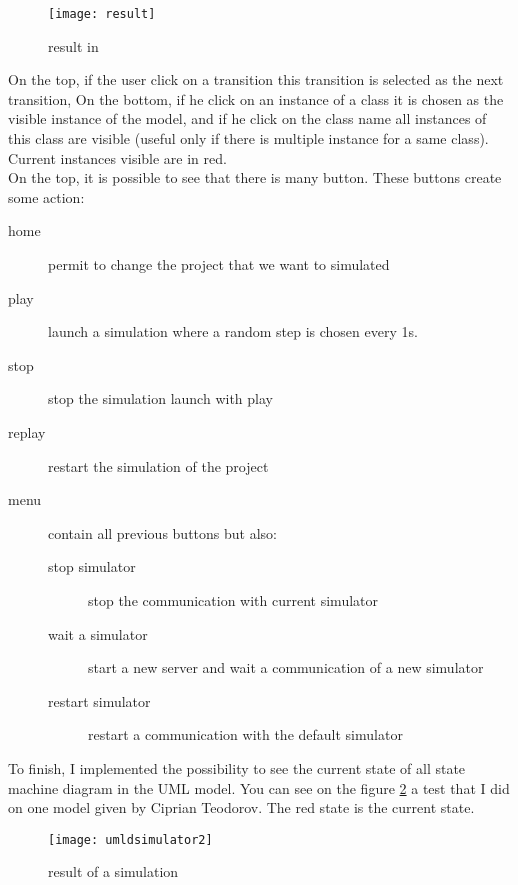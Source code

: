 \begin{figure}[h]
  \centering
  \texttt{[image: result]}
  \caption{result in \umld}
  \label{fig:result}
\end{figure}

On the top, if the user click on a transition this transition is selected as the next transition, On the bottom, if he click on an instance of a class it is chosen as the visible instance of the model, and if he click on the class name all instances of this class are visible (useful only if there is multiple instance for a same class). Current instances visible are in red.
~\\

On the top, it is possible to see that there is many button. These buttons create some action:

\noitemsep
\begin{description}
\item[home] permit to change the project that we want to simulated
\item[play] launch a simulation where a random step is chosen every 1s.
\item[stop] stop the simulation launch with play
\item[replay] restart the simulation of the project
\item[menu] contain all previous buttons but also:
  \begin{description}
  \item[stop simulator] stop the communication with current simulator
  \item[wait a simulator] start a new server and wait a communication of a new simulator
  \item[restart simulator] restart a communication with the default simulator
  \end{description}
\end{description}
\doitemsep


To finish, I implemented the possibility to see the current state of all state machine diagram in the UML model. You can see on the figure \ref{fig:result2} a test that I did on one model given by Ciprian Teodorov. The red state is the current state.

\begin{figure}[h]
  \centering
  \texttt{[image: umldsimulator2]}
  \caption{result of a simulation}
  \label{fig:result2}
\end{figure}




